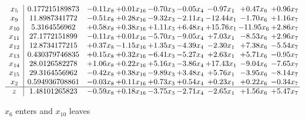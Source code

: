 \documentclass[9pt]{article}
\begin{document}
 \[\begin{array}{c| c c@{\hskip 2pt} c@{\hskip 2pt} c@{\hskip 2pt} c@{\hskip 2pt} c@{\hskip 2pt} c@{\hskip 2pt} c@{\hskip 2pt} }
 x_{5}   &  0.177215189873 & -0.11 x_{8} & +  0.01 x_{16} & -0.70 x_{3} & -0.05 x_{4} & -0.97 x_{1} & +  0.47 x_{6} & +  0.96 x_{7}\\
 x_{9}   &  11.8987341772 & -0.51 x_{8} & +  0.28 x_{16} & -9.32 x_{3} & -2.11 x_{4} & -12.44 x_{1} & -1.70 x_{6} & +  1.16 x_{7}\\
 x_{10}   &  5.3164556962 & +  0.58 x_{8} & +  0.38 x_{16} & +  1.11 x_{3} & +  6.48 x_{4} & + 15.76 x_{1} & -11.95 x_{6} & +  2.86 x_{7}\\
 x_{11}   &  27.1772151899 & -0.11 x_{8} & +  0.01 x_{16} & -5.70 x_{3} & -9.05 x_{4} & +  7.03 x_{1} & -8.53 x_{6} & +  2.96 x_{7}\\
 x_{12}   &  12.8734177215 & +  0.37 x_{8} & -1.15 x_{16} & +  1.35 x_{3} & -4.39 x_{4} & -2.30 x_{1} & +  7.38 x_{6} & -5.54 x_{7}\\
 x_{13}   &  0.430379746835 & +  0.15 x_{8} & +  0.32 x_{16} & -6.41 x_{3} & -5.27 x_{4} & +  2.63 x_{1} & +  5.71 x_{6} & -0.95 x_{7}\\
 x_{14}   &  28.0126582278 & +  1.06 x_{8} & +  0.22 x_{16} & +  5.16 x_{3} & -3.86 x_{4} & + 17.43 x_{1} & -9.04 x_{6} & -7.65 x_{7}\\
 x_{15}   &  29.3164556962 & -0.42 x_{8} & +  0.38 x_{16} & -9.89 x_{3} & +  3.48 x_{4} & +  5.76 x_{1} & -3.95 x_{6} & -8.14 x_{7}\\
 x_{2}   &  0.594936708861 & -0.03 x_{8} & +  0.11 x_{16} & +  0.73 x_{3} & +  0.54 x_{4} & +  0.23 x_{1} & +  0.22 x_{6} & -0.34 x_{7}\\
\hline
z    &  1.48101265823 & -0.59 x_{8} & +  0.18 x_{16} & -3.75 x_{3} & -2.71 x_{4} & -2.65 x_{1} & +  1.56 x_{6} & +  5.47 x_{7}\\
\end{array}\]


 $ x_{6} $ enters and $ x_{10} $ leaves 
\end{document}

